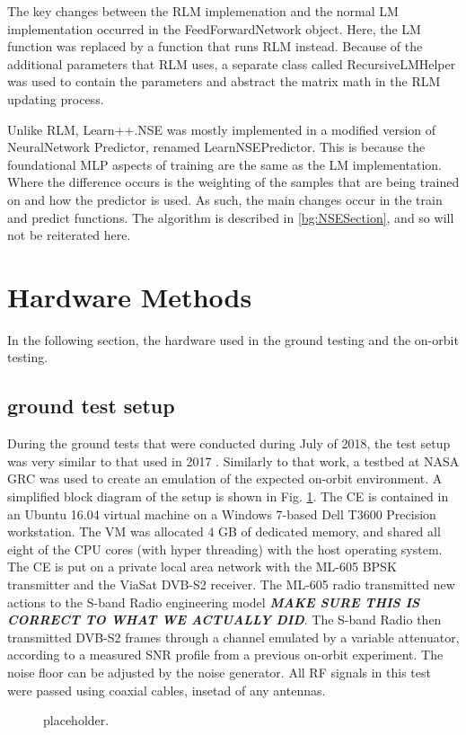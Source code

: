 \par The key changes between the RLM implemenation and the normal LM implementation occurred in the FeedForwardNetwork object. Here, the LM function was replaced by a function that runs RLM instead. Because of the additional parameters that RLM uses, a separate class called RecursiveLMHelper was used to contain the parameters and abstract the matrix math in the RLM updating process.

\par Unlike RLM, Learn++.NSE was mostly implemented in a modified version of NeuralNetwork Predictor, renamed LearnNSEPredictor. This is because the foundational MLP aspects of training are the same as the LM implementation. Where the difference occurs is the weighting of the samples that are being trained on and how the predictor is used. As such, the main changes occur in the train and predict functions. The algorithm is described in \ref{bg:NSESection}, and so will not be reiterated here.
\section{Hardware Methods}\label{methods:hardware}
\par In the following section, the hardware used in the ground testing and the on-orbit testing.
\subsection{ground test setup}

\par During the ground tests that were conducted during July of 2018, the test setup was very similar to that used in 2017 \cite{tim_implementation}.  Similarly to that work, a testbed at NASA GRC was used to create an emulation of the expected on-orbit environment. A simplified block diagram of the setup is shown in Fig. \ref{methods:groundTestFig}. The CE is contained in an Ubuntu 16.04 virtual machine on a Windows 7-based Dell T3600 Precision workstation. The VM was allocated 4 GB of dedicated memory, and shared all eight of the CPU cores (with hyper threading) with the host operating system. The CE is put on a private local area network with the ML-605 BPSK transmitter and the ViaSat DVB-S2 receiver. The ML-605 radio transmitted new actions to the S-band Radio engineering model \textbf{\textit{MAKE SURE THIS IS CORRECT TO WHAT WE ACTUALLY DID}}. The S-band Radio then transmitted DVB-S2 frames through a channel emulated by a variable attenuator, according to a measured SNR profile from a previous on-orbit experiment. The noise floor can be adjusted by the noise generator. All RF signals in this test were passed using coaxial cables, insetad of any antennas.
\begin{figure}[ht]
\caption{placeholder.}\label{methods:groundTestFig}
\end{figure} 

